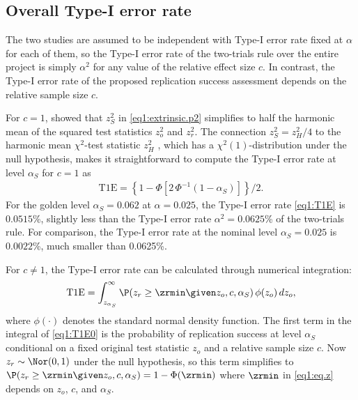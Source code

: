 \subsection{Overall Type-I error rate}\label{sec1:T1E}
The two studies are assumed to be independent with Type-I error rate fixed at
$\alpha$ for each of them, so the Type-I error rate of the two-trials rule over
the entire project is simply $\alpha^2$ for any value of the relative effect
size $c$. In contrast, the Type-I error rate of the proposed replication success
assessment {depends on} the relative sample size $c$.

For $c=1$, \citet[Section 3]{Held2020} showed that $z_S^2$ in
\eqref{eq1:extrinsic.p2} simplifies to half the harmonic mean of the squared test
statistics $z_o^2$ and $z_r^2$. The connection $z_S^2 = z_H^2/4$ to the harmonic
mean $\chi^2$-test statistic $z_H^2$ \citep{Held2020b}, which has a
$\chi^2(1)$-distribution under the null hypothesis, makes it straightforward to
compute the Type-I error rate at level $\alpha_S$ for $c = 1$ as
\begin{eqnarray}\label{eq1:T1E}
\mbox{T1E} =   \left\{1-\Phi\left[2 \, \Phi^{-1}\left(1-\alpha_S \right)
 \right]\right\}/2.
\end{eqnarray}
For the golden level $\alpha_S =0.062$ at $\alpha = 0.025$, the Type-I error
rate \eqref{eq1:T1E} is $0.0515$\%, slightly less than the Type-I error rate
$\alpha^2=0.0625$\% of the two-trials rule. For comparison, the Type-I error
rate at the nominal level $\alpha_S=0.025$ is $0.0022$\%, much smaller than
0.0625\%.


For $c \neq 1$, the Type-I error rate can be calculated through numerical
integration:
\begin{equation}\label{eq1:T1E0}
  \mbox{T1E} = \int_{z_{\alpha_S}}^{\infty}
\P(z_r \geq \zrmin \given z_o, c, \alpha_S) \,
  \phi(z_o) \, dz_o,
\end{equation}
where $\phi(\cdot)$ denotes the standard normal density function. The first term
in the integral of \eqref{eq1:T1E0} is the probability of replication success at
level $\alpha_S$ conditional on a fixed original test statistic $z_o$ and a
relative sample size $c$. Now $z_r \sim \Nor(0,1)$ under the null hypothesis, so
this term simplifies to
$\P(z_r \geq \zrmin \given z_o, c, \alpha_S) = 1 - \Phi(\zrmin)$ where $\zrmin$
in \eqref{eq1:eq.z} depends on $z_o$, $c$, and $\alpha_S$.


